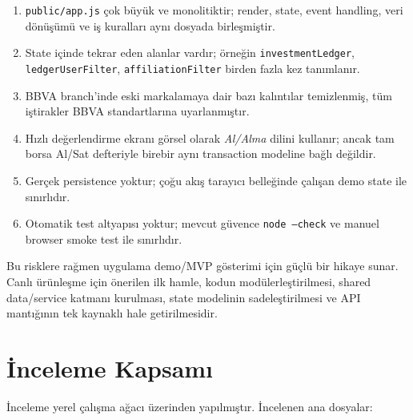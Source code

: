 \documentclass[11pt,a4paper]{article}
\newcommand{\code}[1]{\texttt{#1}}
\begin{document}
\begin{enumerate}
  \item \code{public/app.js} çok büyük ve monolitiktir; render, state, event handling, veri dönüşümü ve iş kuralları aynı dosyada birleşmiştir.
  \item State içinde tekrar eden alanlar vardır; örneğin \code{investmentLedger}, \code{ledgerUserFilter}, \code{affiliationFilter} birden fazla kez tanımlanır.
  \item BBVA branch'inde eski markalamaya dair bazı kalıntılar temizlenmiş, tüm iştirakler BBVA standartlarına uyarlanmıştır.
  \item Hızlı değerlendirme ekranı görsel olarak \textit{Al/Alma} dilini kullanır; ancak tam borsa Al/Sat defteriyle birebir aynı transaction modeline bağlı değildir.
  \item Gerçek persistence yoktur; çoğu akış tarayıcı belleğinde çalışan demo state ile sınırlıdır.
  \item Otomatik test altyapısı yoktur; mevcut güvence \code{node --check} ve manuel browser smoke test ile sınırlıdır.
\end{enumerate}

Bu risklere rağmen uygulama demo/MVP gösterimi için güçlü bir hikaye sunar. Canlı ürünleşme için önerilen ilk hamle, kodun modülerleştirilmesi, shared data/service katmanı kurulması, state modelinin sadeleştirilmesi ve API mantığının tek kaynaklı hale getirilmesidir.

\section{İnceleme Kapsamı}

İnceleme yerel çalışma ağacı üzerinden yapılmıştır. İncelenen ana dosyalar:
\end{document}
